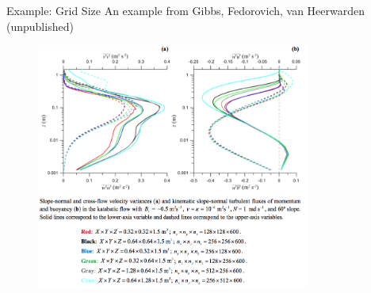 \begin{frame}{Example: Grid Size}
An example from Gibbs, Fedorovich, van Heerwarden (unpublished)
\begin{figure}
\includegraphics[width=0.8\textwidth]{compare22}
\end{figure}
\end{frame}







